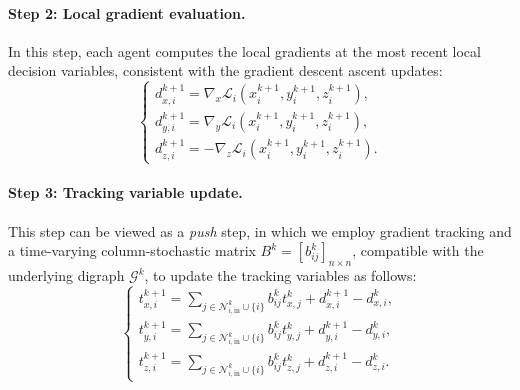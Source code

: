 \documentclass{article}
\theoremstyle{plain}
\theoremstyle{definition}
\theoremstyle{remark}
\begin{document}
\paragraph{Step 2: Local gradient evaluation.} In this step, each agent computes the local gradients at the most recent local decision variables, consistent with the gradient descent ascent updates: 
\begin{equation}\label{localgrad}
    \begin{cases}
        d_{x,i}^{k+1} =\nabla_x \mathcal{L}_{i}(x_{i}^{k+1}, y_{i}^{k+1}, z_{i}^{k+1}), \\
        d_{y,i}^{k+1} =\nabla_y \mathcal{L}_{i}(x_{i}^{k+1}, y_{i}^{k+1}, z_{i}^{k+1}), \\
        d_{z,i}^{k+1} = -\nabla_z \mathcal{L}_{i}(x_{i}^{k+1}, y_{i}^{k+1}, z_{i}^{k+1}).
    \end{cases}
\end{equation}

\paragraph{Step 3: Tracking variable update.} This step can be viewed as a \textit{push} step, in which we employ gradient tracking and a time-varying column-stochastic matrix $B^{k}=[b_{ij}^{k}]_{n\times n}$, compatible with the underlying digraph $\mathcal{G}^{k}$, to update the tracking variables as follows:
\begin{equation}\label{track_v_update}
\begin{cases}
    t_{x,i}^{k+1} = \sum_{j\in\mathcal{N}_{i,\mathrm{in}}^{k}\cup\{i\}}b_{ij}^{k} t_{x,j}^{k} + d_{x,i}^{k+1} - d_{x,i}^{k}, \\
    t_{y,i}^{k+1} = \sum_{j\in\mathcal{N}_{i,\mathrm{in}}^{k}\cup\{i\}}b_{ij}^{k} t_{y,j}^{k} + d_{y,i}^{k+1} - d_{y,i}^{k}, \\
    t_{z,i}^{k+1} = \sum_{j\in\mathcal{N}_{i,\mathrm{in}}^{k}\cup\{i\}}b_{ij}^{k} t_{z,j}^{k} + d_{z,i}^{k+1} - d_{z,i}^{k}.
\end{cases}
\end{equation}
\end{document}
